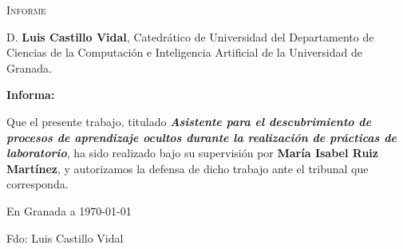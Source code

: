 \newpage
\null
\thispagestyle{empty}
\newpage
\null
\thispagestyle{empty}

\hfill\vfill


\textsc{Informe}\\\bigskip

D. \textbf{Luis Castillo Vidal}, Catedrático de Universidad del Departamento de Ciencias de la Computación e Inteligencia Artificial de la Universidad de Granada.

\medskip

\textbf{Informa:}

\medskip

Que el presente trabajo, titulado \textit{\textbf{Asistente para el descubrimiento de procesos de aprendizaje ocultos durante la realización de prácticas de laboratorio}}, ha sido realizado bajo su supervisión por \textbf{María Isabel Ruiz Martínez}, y autorizamos la defensa de dicho trabajo ante el tribunal
que corresponda.

\medskip

En Granada a \today
\begin{flushleft}
Fdo: Luis Castillo Vidal

\end{flushleft}

\vfill

\endinput